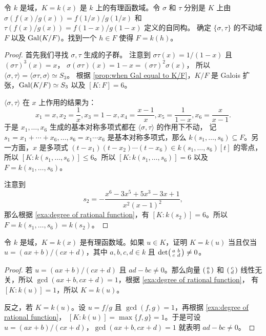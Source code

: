\begin{problem}
  令 $k$ 是域，$K=k(x)$ 是 $k$ 上的有理函数域。令 $\sigma$ 和 $\tau$ 分别是 $K$ 上由
  $\sigma(f(x)/g(x))=f(1/x)\big/ g(1/x)$ 和 $\tau(f(x)/g(x))=f(1-x)/g(1-x)$ 定义的自同构。
  确定 $\{\sigma,\tau\}$ 的不动域 $F$ 以及 $\operatorname{Gal}(K/F)$。找到一个 $h\in F$ 使得 $F=k(h)$。
\end{problem}
\begin{proof}
  首先我们寻找 $\sigma,\tau$ 生成的子群。
  注意到 $\sigma\tau(x)=1/(1-x)$ 且 $(\sigma\tau)^3(x)=x$，
  $\sigma(\sigma\tau)(x)=1-x=(\sigma\tau)^2\sigma(x)$，
  所以 $\langle\sigma,\tau\rangle=\langle\sigma\tau,\sigma\rangle\simeq S_3$。
  根据 \autoref{prop:when Gal equal to K/F}，$K/F$ 是 Galois 扩张，$\operatorname{Gal}(K/F)\simeq S_3$
  以及 $[K:F]=6$。

  $\langle\sigma,\tau\rangle$ 在 $x$ 上作用的结果为：
  \[
    x_1=x,x_2=\frac{1}{x},x_3=1-x,x_4=\frac{x-1}{x},x_5=\frac{1}{1-x},x_6=\frac{x}{x-1}.
  \]
  于是 $x_1,\dots,x_6$ 生成的基本对称多项式都在 $\langle\sigma,\tau\rangle$ 的作用下不动，
  记 $s_1=x_1+\cdots+x_6,\dots,s_6=x_1\cdots x_6$ 是基本对称多项式，那么
  $k(s_1,\dots,s_6)\subseteq F$。另一方面，$x$ 是多项式 $(t-x_1)(t-x_2)\cdots(t-x_6)\in k(s_1,\dots,s_6)[t]$
  的零点，所以 $[K:k(s_1,\dots,s_6)]\leq 6$。所以 $[K:k(s_1,\dots,s_6)]=6$
  以及 $F=k(s_1,\dots,s_6)$。

  注意到
  \[
    s_2=-\frac{x^6-3x^5+5x^3-3x+1}{x^2(x-1)^2},
  \]
  那么根据 \autoref{exa:degree of rational function}，有
  $[K:k(s_2)]=6$。所以 $F=k(s_1,\dots,s_6)=k(s_2)$。
\end{proof}

\begin{problem}
  令 $k$ 是域，$K=k(x)$ 是有理函数域。如果 $u\in K$，证明 $K=k(u)$ 当且仅当
  $u=(ax+b)/(cx+d)$，其中 $a,b,c,d\in k$ 且 $\det \begin{psmallmatrix}
    a & b \\ c & d
  \end{psmallmatrix}\neq 0$。
\end{problem}
\begin{proof}
  若 $u=(ax+b)/(cx+d)$ 且 $ad-bc\neq 0$。那么向量 
  $\begin{psmallmatrix}
    a \\ b
  \end{psmallmatrix}$
  和
  $\begin{psmallmatrix}
    c \\ d
  \end{psmallmatrix}$
  线性无关，所以 $\gcd(ax+b,cx+d)=1$，根据 \autoref{exa:degree of rational function}，
  有 $[K:k(u)]=1$，所以 $K=k(u)$。

  反之，若 $K=k(u)$。设 $u=f/g$ 且 $\gcd(f,g)=1$，再根据 \autoref{exa:degree of rational function}，
  $[K:k(u)]=\max\{f,g\}=1$。于是可设 $u=(ax+b)/(cx+d)$，$\gcd(ax+b,cx+d)=1$  就表明
  $ad-bc\neq 0$。
\end{proof}

